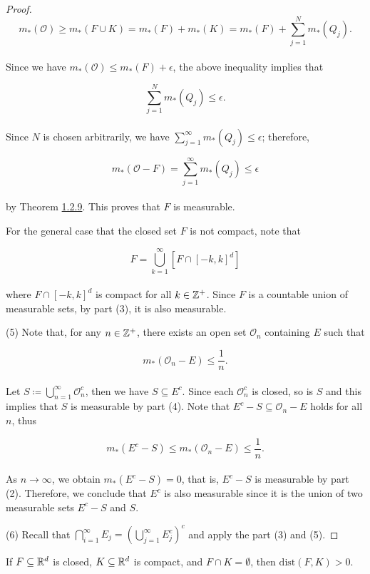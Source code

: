 \documentclass[12pt, a4paper, openany, twoside]{book}
\theoremstyle{definition}
\theoremstyle{remark}
\theoremstyle{plain}
\numberwithin{equation}{section}
\begin{document}
\begin{proof}
    \[m_*(\mathcal{O})\geq m_*(F\cup K)=m_*(F)+m_*(K)=m_*(F)+\sum_{j=1}^{N}{m_*(Q_j)}.\]
    \\
    Since we have $m_*(\mathcal{O})\leq m_*(F)+\epsilon$, the above inequality implies that 

    \[\sum_{j=1}^{N}{m_*(Q_j)}\leq \epsilon.\]
    \\
    Since $N$ is chosen arbitrarily, we have $\sum_{j=1}^{\infty}{m_*(Q_j)}\leq \epsilon$; therefore, 

    \[m_*(\mathcal{O}-F)=\sum_{j=1}^{\infty}{m_*(Q_j)}\leq \epsilon\]
    \\
    by Theorem \hyperref[Theorem 1.2.9]{1.2.9}. This proves that $F$ is measurable.

    For the general case that the closed set $F$ is not compact, note that 

    \[F=\bigcup_{k=1}^{\infty}{\left[F\cap [-k,k]^d\right]}\]
    \\
    where $F\cap [-k,k]^d$ is compact for all $k\in{\mathbb {Z}}^+$. Since $F$ is a countable union of measurable sets, by part (3), it is also measurable.

    \vspace{5mm}
    (5) Note that, for any $n\in{\mathbb {Z}}^+$, there exists an open set $\mathcal{O}_n$ containing $E$ such that 

    \[m_*(\mathcal{O}_n-E)\leq\frac{1}{n}.\]
    \\
    Let $S\coloneqq\bigcup_{n=1}^{\infty}{\mathcal{O}_n^c}$, then we have $S\subseteq E^c$. Since each $\mathcal{O}_n^c$ is closed, so is $S$ and this implies that $S$ is measurable by part (4). Note that $E^c-S\subseteq\mathcal{O}_n-E$ holds for all $n$, thus
    
    \[m_*(E^c-S)\leq m_*(\mathcal{O}_n-E)\leq\frac{1}{n}.\]
    \\
    As $n\rightarrow\infty$, we obtain $m_*(E^c-S)=0$, that is, $E^c-S$ is measurable by part (2). Therefore, we conclude that $E^c$ is also measurable since it is the union of two measurable sets $E^c-S$ and $S$.

    \vspace{5mm}
    (6) Recall that $\bigcap_{i=1}^{\infty}{E_j}=\left(\bigcup_{j=1}^{\infty}{E_j^c}\right)^c$ and apply the part (3) and (5).
\end{proof}
\vspace{5mm}
\begin{tcolorbox}[colback=yellow!10!white,colframe=red!75!black,title=Lemma 1.3.2]\label{Lemma 1.3.2}
    If $F\subseteq{\mathbb {R}}^d$ is closed, $K\subseteq{\mathbb {R}}^d$ is compact, and $F\cap K=\emptyset$, then $\mathrm{dist}(F,K)>0$.
\end{tcolorbox}
\end{document}
